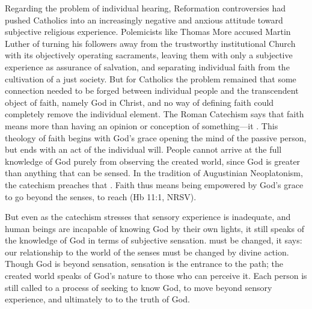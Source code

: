 Regarding the problem of individual hearing, Reformation controversies had
pushed Catholics into an increasingly negative and anxious attitude toward
subjective religious experience.
Polemicists like Thomas More accused Martin Luther of turning his followers away
from the trustworthy institutional Church with its objectively operating
sacraments, leaving them with only a subjective experience as assurance of
salvation, and separating individual faith from the cultivation of a just
society.%
    \Autocite[]{Schreiner:Certainty}
But for Catholics the problem remained that some connection needed to be forged
between individual people and the transcendent object of faith, namely God in
Christ, and no way of defining faith could completely remove the individual
element.
The Roman Catechism says that faith means more than having an opinion or
conception of something---it .%
    \Autocite
    [15: .]
    {Catholic:Catechismus1614}
This theology of faith begins with God's grace opening the mind of the passive
person, but ends with an act of the individual will.
People cannot arrive at the full knowledge of God purely from observing the
created world, since God is greater than anything that can be sensed.
In the tradition of Augustinian Neoplatonism, the catechism preaches that
.%
    \Autocite
    [18: .]
    {Catholic:Catechismus1614}
Faith thus means being empowered by God's grace to go beyond the senses, to
reach  (Hb 11:1, NRSV).

But even as the catechism stresses that sensory experience is inadequate, and
human beings are incapable of knowing God by their own lights, it still speaks
of the knowledge of God in terms of subjective sensation.
 must be changed, it says: our relationship to the world of
the senses must be changed by divine action.
Though God is beyond sensation, sensation is the entrance to the path; the
created world speaks of God's nature to those who can perceive it.
Each person is still called to a process of seeking to know God, to move beyond
sensory experience, and ultimately to  to the truth of God.

